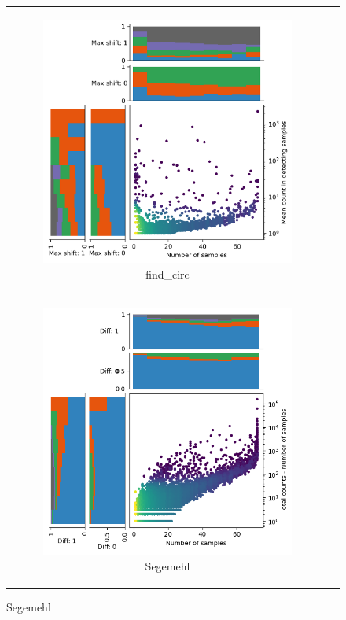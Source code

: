\begin{figure}[ht]
\begin{tabular}{cc}
\begin{subfigure}{.4\textwidth}
            \includegraphics[width=\linewidth]{chapters/4_results_and_discussion/figures/detection/density/find_circ.png}
            \caption{find\_circ}
            \label{fig:detection_density_find-circ} \end{subfigure}
        \\
        \begin{subfigure}{.4\textwidth} \centering

            \includegraphics[width=\linewidth]{chapters/4_results_and_discussion/figures/detection/density/segemehl.png}
            \caption{Segemehl}
            \label{fig:detection_density_segemehl} \end{subfigure}


\end{tabular}
\end{figure}
